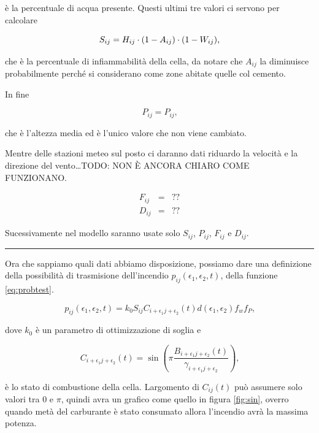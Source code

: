 \documentclass{article}
\newcommand{\e}{\epsilon}
\newlength{\rulewidth}\setlength{\rulewidth}{0.4pt}
\newcommand{\myrule}{\noindent\rule{\textwidth}{\rulewidth}}
\begin{document}
è la percentuale di acqua presente. Questi ultimi tre valori ci servono per
calcolare

\begin{equation}
S_{ij} = H_{ij} \cdot (1-A_{ij}) \cdot (1-W_{ij})\textrm{,}\\
\end{equation}

che è la percentuale di infiammabilità della cella, da notare che $A_{ij}$ la
diminuisce probabilmente perché si considerano come zone abitate quelle col
cemento.

In fine

\begin{equation}
P_{ij} = P_{ij}\textrm{,}
\end{equation}

che  è l'altezza media ed è l'unico valore che non viene cambiato.

Mentre delle stazioni meteo sul posto ci daranno dati riduardo la velocità e la
direzione del vento\dots TODO: NON È ANCORA CHIARO COME FUNZIONANO.

\begin{eqnarray}
	F_{ij} &=& ??\\
	D_{ij} &=& ??
\end{eqnarray}

Sucessivamente nel modello saranno usate solo $S_{ij}$, $P_{ij}$, $F_{ij}$ e
$D_{ij}$.

\myrule

Ora che sappiamo quali dati abbiamo disposizione, possiamo dare una definizione
della possibilità di trasmisione dell'incendio $p_{ij}(\e_1, \e_2, t)$, della
funzione \ref{eq:probtest}.

\begin{equation}\label{eq:prob}
p_{ij}(\e_1, \e_2, t) = k_0 S_{ij} C_{i+\e_1j+\e_2}(t) d(\e_1, \e_2) f_w f_P\textrm{,}
\end{equation}

dove $k_0$ è un parametro di ottimizzazione di soglia e

\begin{equation}\label{eq:combust}
C_{i+\e_1j+\e_2}(t) = \sin\left(\pi\frac{B_{i+\e_1j+\e_2}(t)}{\gamma_{i+\e_1j+\e_2}}\right)\textrm{,}
\end{equation}

è lo stato di combustione della cella. Largomento di $C_{ij}(t)$ può assumere
solo valori tra 0 e $\pi$, quindi avra un grafico come quello in figura
\ref{fig:sin}, overro quando metà del carburante è stato consumato allora
l'incendio avrà la massima potenza.
\end{document}
